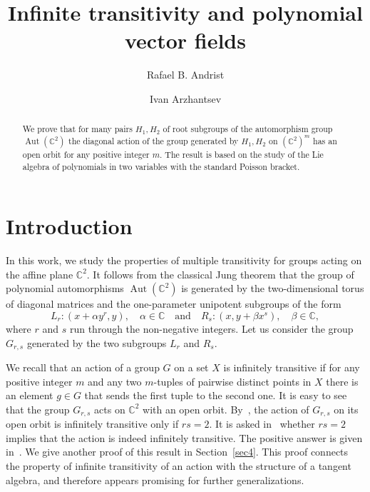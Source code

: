 \documentclass[a4paper,draft,reqno,12pt]{amsart}
\theoremstyle{definition}
\theoremstyle{remark}
\DeclareMathOperator{\Aut}{Aut}
\def\CC{{\mathbb C}}
\begin{document}
\date{}
\title{Infinite transitivity and polynomial vector fields}
\author{Rafael B. Andrist}
\address{Faculty of Mathematics and Physics, University of Ljubljana, Ljubljana, Slovenia}
\author{Ivan Arzhantsev}
\address{Faculty of Computer Science, HSE University, Pokrovsky Boulevard 11, Moscow, 109028 Russia}
%
%
%

\maketitle
%
\begin{abstract}
We prove that for many pairs $H_1, H_2$ of root subgroups of the automorphism group $\Aut(\CC^2)$ the diagonal action of the group generated by $H_1, H_2$ on $(\CC^2)^m$ 
has an open orbit for any positive integer $m$. The result is based on the study of the Lie algebra of polynomials in two variables with the standard Poisson bracket. 
\end{abstract} 

\section{Introduction}
\label{sec1}

In this work, we study the properties of multiple transitivity for groups acting on the affine plane $\CC^2$. It follows from the classical Jung theorem that the group of polynomial automorphisms $\Aut(\CC^2)$ is generated by the two-dimensional torus of diagonal matrices and the one-parameter unipotent subgroups of the form
$$
L_r\colon (x+\alpha y^r,y), \quad \alpha\in\CC \quad \text{and}\quad R_s\colon (x,y+\beta x^s), \quad \beta\in\CC,
$$
where $r$ and $s$ run through the non-negative integers. Let us consider the group $G_{r,s}$ generated by the two subgroups $L_r$ and $R_s$. 

We recall that an action of a group $G$ on a set $X$ is infinitely transitive if for any positive integer $m$ and any two $m$-tuples of pairwise distinct points in $X$ there is an element $g\in G$ that sends the first tuple to the second one. It is easy to see that the group $G_{r,s}$ acts on $\CC^2$ with an open orbit. By~\cite{AKZ}, the action of $G_{r,s}$ on its open orbit is infinitely transitive only if $rs=2$. It is asked in~\cite{AKZ} whether $rs=2$ implies that the action is indeed infinitely transitive. The positive answer is given in~\cite{LPS, CT}.  We give another proof of this result in Section~\ref{sec4}.  This proof connects the property of infinite transitivity of an action with the structure of a tangent algebra, and therefore appears promising for further generalizations.
\end{document}
